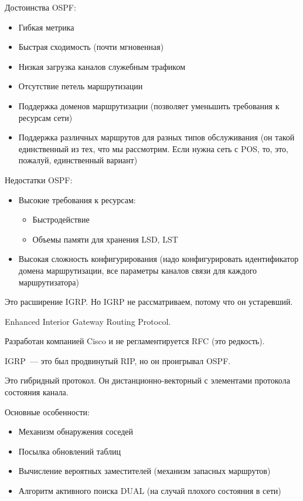 Достоинства OSPF:
\begin{itemize}
    \item Гибкая метрика
    \item Быстрая сходимость (почти мгновенная)
    \item Низкая загрузка каналов служебным трафиком
    \item Отсутствие петель маршрутизации
    \item Поддержка доменов маршрутизации (позволяет уменьшить требования к ресурсам сети)
    \item Поддержка различных маршрутов для разных типов обслуживания (он такой единственный из тех, что мы рассмотрим. Если нужна сеть с POS, то, это, пожалуй, единственный вариант)
\end{itemize}
Недостатки OSPF:
\begin{itemize}
    \item Высокие требования к ресурсам:
    \begin{itemize}
        \item Быстродействие
        \item Объемы памяти для хранения LSD, LST
    \end{itemize}
    \item Высокая сложность конфигурирования (надо конфигурировать идентификатор домена маршрутизации, все параметры каналов связи для каждого маршрутизатора)
\end{itemize}


Это расширение IGRP. Но IGRP не рассматриваем, потому что он устаревший.

Enhanced Interior Gateway Routing Protocol.

Разработан компанией Cisco и не регламентируется RFC (это редкость).

IGRP~--- это был продвинутый RIP, но он проигрывал OSPF.

Это гибридный протокол. Он дистанционно-векторный с элементами протокола состояния канала.

Основные особенности:
\begin{itemize}
    \item Механизм обнаружения соседей
    \item Посылка обновлений таблиц
    \item Вычисление вероятных заместителей (механизм запасных маршрутов)
    \item Алгоритм активного поиска DUAL (на случай плохого состояния в сети)
\end{itemize}

